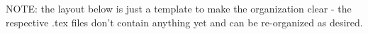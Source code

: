 
\label{ch:glissade}

NOTE: the layout below is just a template to make the organization clear - the respective .tex files don't contain anything yet and can be re-organized as desired.








